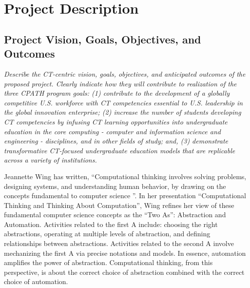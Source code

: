 
\section*{Project Description}
\renewcommand{\thepage} {C--\arabic{page}}

\subsection*{Project Vision, Goals, Objectives, and Outcomes}


{\em Describe the CT-centric vision, goals, objectives, and anticipated outcomes of the proposed project. Clearly indicate how they will contribute to realization of the three CPATH program goals: (1) contribute to the development of a globally competitive U.S. workforce with CT competencies essential to U.S. leadership in the global innovation enterprise; (2) increase the number of students developing CT competencies by infusing CT learning opportunities into undergraduate education in the core computing - computer and information science and engineering - disciplines, and in other fields of study; and, (3) demonstrate transformative CT-focused undergraduate education models that are replicable across a variety of institutions.
}

\bigskip

Jeannette Wing has written, ``Computational thinking involves solving
problems, designing systems, and understanding human behavior, by drawing
on the concepts fundamental to computer science \cite{Wing06}''.  In her
presentation ``Computational Thinking and Thinking About Computation'',
Wing refines her view of these fundamental computer science concepts as
the ``Two As'': Abstraction and Automation.  Activities
related to the first A include: choosing the right abstractions, operating
at multiple levels of abstraction, and defining relationships between
abstractions.  Activities related to the second A involve mechanizing the
first A via precise notations and models.  In essence, automation amplifies
the power of abstraction.  Computational thinking, from this perspective,
is about the correct choice of abstraction combined with the correct choice
of automation.


